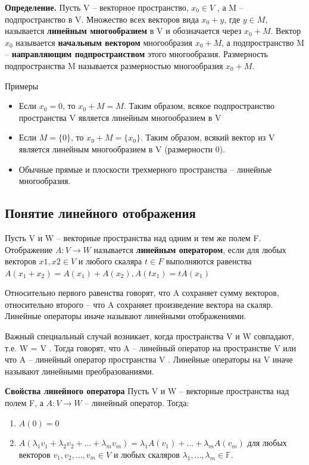 \documentclass[a4paper]{article}
\begin{document}
\textbf{Определение.} Пусть V – векторное пространство, $x_0 \in V$ , а M – подпространство в V.
Множество всех векторов вида $x_0 + y$, где $y \in M$, называется \textbf{линейным
многообразием} в V и обозначается через $x_0 + M$. Вектор $x_0$ называется
\textbf{начальным вектором }многообразия $x_0 + M$, а подпространство M –
\textbf{направляющим подпространством} этого многообразия. Размерность
подпространства M называется размерностью многообразия $x_0 + M$.

Примеры
\begin{itemize}
\item Если $x_0 = 0$, то $x_0 + M = M$. Таким образом, всякое
подпространство пространства V является линейным многообразием в V
\item Если $M = \{ 0 \}$, то $x_0 + M = \{ x_0 \}$. Таким образом, всякий
вектор из V является линейным многообразием в V (размерности 0).
\item Обычные прямые и плоскости трехмерного пространства –
линейные многообразия.
\end{itemize}

\newpage \begin{center}\begin{Large}\end{Large}\end{center}
\subsection*{Понятие линейного отображения}

Пусть V и W – векторные пространства над одним и тем же полем F.
Отображение $A: V \rightarrow W$ называется \textbf{линейным оператором}, если
для любых векторов $x1, x2 \in V$ и любого скаляра $t \in F$ выполняются
равенства $A(x_1+x_2) = A(x_1) + A(x_2), A(tx_1) = tA(x_1)$

Относительно первого равенства говорят, что A сохраняет сумму векторов,
относительно второго – что A сохраняет произведение вектора на скаляр.
Линейные операторы иначе называют линейными отображениями.

Важный специальный случай возникает, когда пространства V и W
совпадают, т.е. W = V . Тогда говорят, что A – линейный оператор
на пространстве V или что A – линейный оператор пространства V .
Линейные операторы на V иначе называют линейными преобразованиями.

\begin{htheorem}
\textbf{Свойства линейного оператора}
Пусть V и W – векторные пространства над полем F, а $A: V \rightarrow W$ –
линейный оператор. Тогда:
\begin{enumerate}
\item $A(0) = 0$
\item $A(\lambda_1v_1 + \lambda_2v_2 + ... + \lambda_mv_m) = \lambda_1A(v_1)+...+\lambda_m A(v_m)$ для любых векторов $v_1,v_2, ..., v_m \in V$ и любых скаляров $\lambda_1, ..., \lambda_m \in \mathbb{F}$.
\end{enumerate}
\end{htheorem}
\end{document}

